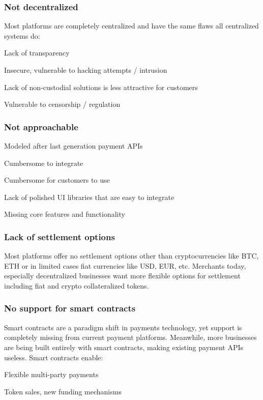 \documentclass[11pt]{article}
\begin{document}
\subsubsection{Not decentralized}

Most platforms are completely centralized and have the same flaws all centralized systems do:


Lack of transparency


Insecure, vulnerable to hacking attempts / intrusion


Lack of non-custodial solutions is less attractive for customers


Vulnerable to censorship / regulation


\subsubsection{Not approachable}

Modeled after last generation payment APIs


Cumbersome to integrate


Cumbersome for customers to use


Lack of polished UI libraries that are easy to integrate


Missing core features and functionality


\subsubsection{Lack of settlement options}

Most platforms offer no settlement options other than cryptocurrencies like BTC, ETH or in limited cases fiat currencies like USD, EUR, etc. Merchants today, especially decentralized businesses want more flexible options for settlement including fiat and crypto collateralized tokens.


\subsubsection{No support for smart contracts}

Smart contracts are a paradigm shift in payments technology, yet support is completely missing from current payment platforms. Meanwhile, more businesses are being built entirely with smart contracts, making existing payment APIs useless. Smart contracts enable:


Flexible multi-party payments


Token sales, new funding mechanisms
\end{document}
